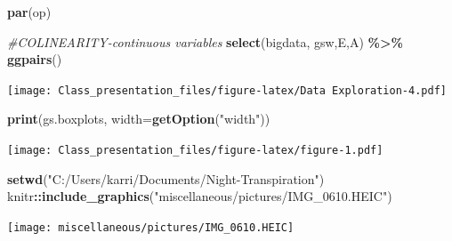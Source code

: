 \documentclass[
]{article}
\newenvironment{Shaded}{\begin{snugshade}}{\end{snugshade}}
\newcommand{\AttributeTok}[1]{\textcolor[rgb]{0.13,0.29,0.53}{#1}}
\newcommand{\CommentTok}[1]{\textcolor[rgb]{0.56,0.35,0.01}{\textit{#1}}}
\newcommand{\FunctionTok}[1]{\textcolor[rgb]{0.13,0.29,0.53}{\textbf{#1}}}
\newcommand{\NormalTok}[1]{#1}
\newcommand{\SpecialCharTok}[1]{\textcolor[rgb]{0.81,0.36,0.00}{\textbf{#1}}}
\newcommand{\StringTok}[1]{\textcolor[rgb]{0.31,0.60,0.02}{#1}}
\begin{document}
\begin{Shaded}
\begin{Highlighting}[]
\FunctionTok{par}\NormalTok{(op)}

\CommentTok{\#COLINEARITY{-}continuous variables}
\FunctionTok{select}\NormalTok{(bigdata, gsw,E,A) }\SpecialCharTok{\%\textgreater{}\%}
\FunctionTok{ggpairs}\NormalTok{() }
\end{Highlighting}
\end{Shaded}

\texttt{[image: Class\_presentation\_files/figure-latex/Data Exploration-4.pdf]}

\begin{Shaded}
\begin{Highlighting}[]
\FunctionTok{print}\NormalTok{(gs.boxplots, }\AttributeTok{width=}\FunctionTok{getOption}\NormalTok{(}\StringTok{"width"}\NormalTok{))}
\end{Highlighting}
\end{Shaded}

\texttt{[image: Class\_presentation\_files/figure-latex/figure-1.pdf]}

\begin{Shaded}
\begin{Highlighting}[]
\FunctionTok{setwd}\NormalTok{(}\StringTok{"C:/Users/karri/Documents/Night{-}Transpiration"}\NormalTok{)}
\NormalTok{knitr}\SpecialCharTok{::}\FunctionTok{include\_graphics}\NormalTok{(}\StringTok{"miscellaneous/pictures/IMG\_0610.HEIC"}\NormalTok{)}
\end{Highlighting}
\end{Shaded}

\texttt{[image: miscellaneous/pictures/IMG\_0610.HEIC]}
\end{document}
